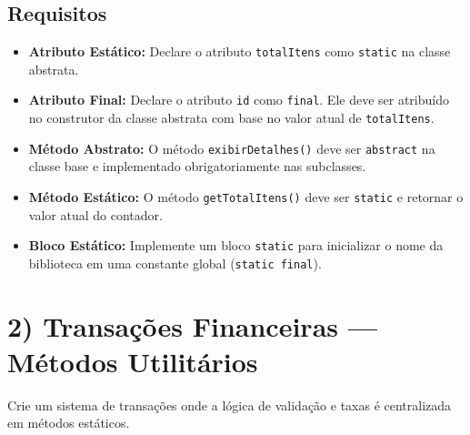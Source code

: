 \documentclass[12pt]{article}
\begin{document}
\subsection*{Requisitos}
\begin{itemize}
    \item \textbf{Atributo Estático:} Declare o atributo \texttt{totalItens} como \texttt{static} na classe abstrata.
    \item \textbf{Atributo Final:} Declare o atributo \texttt{id} como \texttt{final}. Ele deve ser atribuído no construtor da classe abstrata com base no valor atual de \texttt{totalItens}.
    \item \textbf{Método Abstrato:} O método \texttt{exibirDetalhes()} deve ser \texttt{abstract} na classe base e implementado obrigatoriamente nas subclasses.
    \item \textbf{Método Estático:} O método \texttt{getTotalItens()} deve ser \texttt{static} e retornar o valor atual do contador.
    \item \textbf{Bloco Estático:} Implemente um bloco \texttt{static} para inicializar o nome da biblioteca em uma constante global (\texttt{static final}).
\end{itemize}

\section*{2) Transações Financeiras — Métodos Utilitários}
Crie um sistema de transações onde a lógica de validação e taxas é centralizada em métodos estáticos.

\begin{center}
\end{center}
\end{document}
